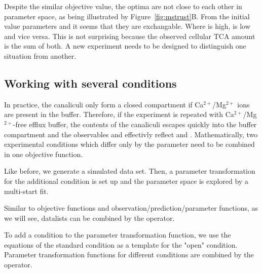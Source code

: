 \documentclass[article]{jss}
\begin{document}
Despite the similar objective value, the optima are not close to each other in parameter space, as being illustrated by Figure~\ref{fig:mstrust}B. From the initial value parameters  and  it seems that they are exchangable. Where  is high,  is low and vice versa. This is not surprising because the observed cellular TCA amount is the sum of both. A new experiment needs to be designed to distinguish one situation from another.

\subsection{Working with several conditions}\label{sec:conditions}

In practice, the canaliculi only form a closed compartment if Ca$^{2+}$/Mg$^{2+}$ ions are present in the buffer. Therefore, if the experiment is repeated with Ca$^{2+}$/Mg$^{2+}$-free efflux buffer, the contents of the canaliculi escapes quickly into the buffer compartment and the observables  and  effectivly reflect  and . Mathematically, two experimental conditions which differ only by the  parameter need to be combined in one objective function.

Like before, we generate a simulated data set. Then, a parameter transformation for the additional condition is set up and the parameter space is explored by a multi-start fit.

\begin{CodeChunk}
\end{CodeChunk}
Similar to objective functions and observation/prediction/parameter functions, as we will see, datalists can be combined by the  operator.

To add a condition to the parameter transformation function, we use the equations of the standard condition as a template for the "open" condition. Parameter transformation functions for different conditions are combined by the  operator.
\end{document}
